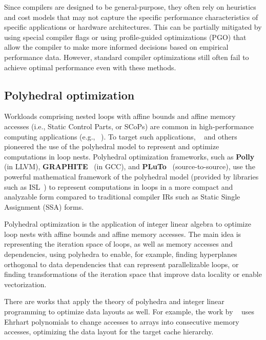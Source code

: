 Since compilers are designed to be general-purpose, they often rely on heuristics and cost models that may not capture the specific performance characteristics of specific applications or hardware architectures. This can be partially mitigated by using special compiler flags or using profile-guided optimizations (PGO) that allow the compiler to make more informed decisions based on empirical performance data. However, standard compiler optimizations still often fail to achieve optimal performance even with these methods.


\subsection{Polyhedral optimization}\label{sec:polyhedral-optimization}

Workloads comprising nested loops with affine bounds and affine memory accesses (i.e., Static Control Parts, or SCoPs) are common in high-performance computing applications (e.g., \citeauthor{bacon1994compiler}~\cite{bacon1994compiler}). To target such applications, \citeauthor{feautrier1992some}~\cite{feautrier1992some} and others pioneered the use of the polyhedral model to represent and optimize computations in loop nests. Polyhedral optimization frameworks, such as \textbf{Polly}~\cite{grosser2012polly} (in LLVM), \textbf{GRAPHITE}~\cite{trifunovic2010graphite} (in GCC), and \textbf{PLuTo}~\cite{bondhugula2008pluto} (source-to-source), use the powerful mathematical framework of the polyhedral model (provided by libraries such as ISL~\cite{verdoolaege2010isl}) to represent computations in loops in a more compact and analyzable form compared to traditional compiler IRs such as Static Single Assignment (SSA) forms.

Polyhedral optimization is the application of integer linear algebra to optimize loop nests with affine bounds and affine memory accesses. The main idea is representing the iteration space of loops, as well as memory accesses and dependencies, using polyhedra to enable, for example, finding hyperplanes orthogonal to data dependencies that can represent parallelizable loops, or finding transformations of the iteration space that improve data locality or enable vectorization.

There are works that apply the theory of polyhedra and integer linear programming to optimize data layouts as well. For example, the work by \citeauthor{clauss2000automatic}~\cite{clauss2000automatic} uses Ehrhart polynomials to change accesses to arrays into consecutive memory accesses, optimizing the data layout for the target cache hierarchy.

